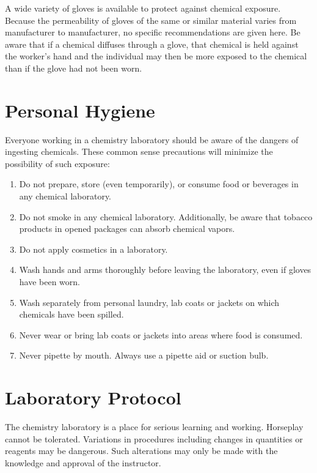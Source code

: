 \documentclass[letterpaper,10pt,english]{sphinxmanual}
\begin{document}
A wide variety of gloves is available to protect against chemical exposure. Because the permeability of gloves of the same or similar material varies from manufacturer to manufacturer, no specific recommendations are given here. Be aware that if a chemical diffuses through a glove, that chemical is held against the worker’s hand and the individual may then be more exposed to the chemical than if the glove had not been worn.


\section{Personal Hygiene}
\label{\detokenize{Laboratory_Safety/Laboratory_Safety:personal-hygiene}}\label{\detokenize{Laboratory_Safety/Laboratory_Safety:heading-laboratory-safety-personal-hygiene}}
Everyone working in a chemistry laboratory should be aware of the dangers of ingesting chemicals. These common sense precautions will minimize the possibility of such exposure:
\begin{enumerate}
\item {} 
Do not prepare, store (even temporarily), or consume food or beverages in any chemical laboratory.

\item {} 
Do not smoke in any chemical laboratory. Additionally, be aware that tobacco products in opened packages can absorb chemical vapors.

\item {} 
Do not apply cosmetics in a laboratory.

\item {} 
Wash hands and arms thoroughly before leaving the laboratory, even if gloves have been worn.

\item {} 
Wash separately from personal laundry, lab coats or jackets on which chemicals have been spilled.

\item {} 
Never wear or bring lab coats or jackets into areas where food is consumed.

\item {} 
Never pipette by mouth. Always use a pipette aid or suction bulb.

\end{enumerate}


\section{Laboratory Protocol}
\label{\detokenize{Laboratory_Safety/Laboratory_Safety:laboratory-protocol}}\label{\detokenize{Laboratory_Safety/Laboratory_Safety:heading-laboratory-safety-laboratory-protocol}}
The chemistry laboratory is a place for serious learning and working. Horseplay cannot be tolerated. Variations in procedures including changes in quantities or reagents may be dangerous. Such alterations may only be made with the knowledge and approval of the instructor.
\end{document}
